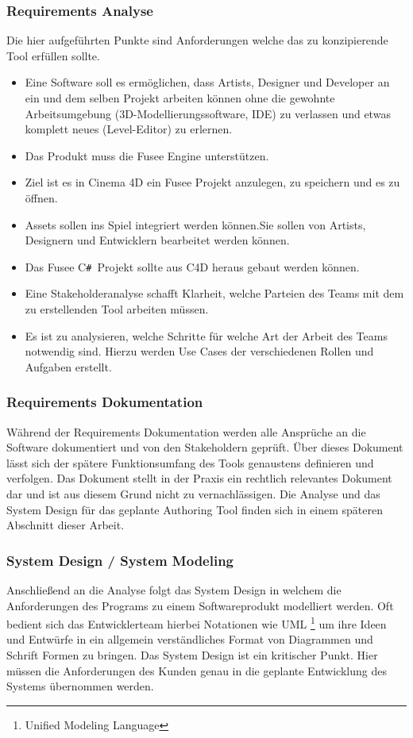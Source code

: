\documentclass[pagesize, paper=a4, fontsize=12pt, titlepage=true, headings=small, headnosepline, abstractoff, liststotoc, nochapterprefix, plainheadsepline, twoside]{scrreprt}
\newcommand{\CSS}{C\texttt{\# }}
\begin{document}
\subsubsection{Requirements Analyse}
Die hier aufgeführten Punkte sind Anforderungen welche das zu konzipierende Tool erfüllen sollte.
\begin{itemize}
\item Eine Software soll es ermöglichen, dass Artists, Designer und Developer an ein und dem selben Projekt arbeiten können ohne die gewohnte Arbeitsumgebung (3D-Modellierungssoftware, IDE) zu verlassen und etwas komplett neues (Level-Editor) zu erlernen.
\item Das Produkt muss die Fusee Engine unterstützen.
\item Ziel ist es in Cinema 4D ein Fusee Projekt anzulegen, zu speichern und es zu öffnen.
\item Assets sollen ins Spiel integriert werden können.Sie sollen von Artists, Designern und Entwicklern bearbeitet werden können.
\item Das Fusee \CSS Projekt sollte aus C4D heraus gebaut werden können.
\item Eine Stakeholderanalyse schafft Klarheit, welche Parteien des Teams mit dem zu erstellenden Tool arbeiten müssen.
\item Es ist zu analysieren, welche Schritte für welche Art der Arbeit des Teams notwendig sind. Hierzu werden Use Cases der verschiedenen Rollen und Aufgaben erstellt.
\end{itemize}
\subsubsection{Requirements Dokumentation}
Während der Requirements Dokumentation werden alle Ansprüche an die Software dokumentiert und von den Stakeholdern geprüft. Über dieses Dokument lässt sich der spätere Funktionsumfang des Tools genaustens definieren und verfolgen. Das Dokument stellt in der Praxis ein rechtlich relevantes Dokument dar und ist aus diesem Grund nicht zu vernachlässigen. Die Analyse und das System Design für das geplante Authoring Tool finden sich in einem späteren Abschnitt dieser Arbeit.

\subsubsection{System Design / System Modeling}
Anschließend an die Analyse folgt das System Design in welchem die Anforderungen des Programs zu einem Softwareprodukt modelliert werden. Oft bedient sich das Entwicklerteam hierbei Notationen wie UML \footnote{Unified Modeling Language} um ihre Ideen und Entwürfe in ein allgemein verständliches Format von Diagrammen und Schrift Formen zu bringen. Das System Design ist ein kritischer Punkt. Hier müssen die Anforderungen des Kunden genau in die geplante Entwicklung des Systems übernommen werden.
\end{document}

